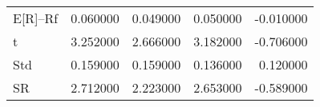 \begin{tabular}{lrrrr}
\toprule
\midrule
E[R]--Rf & 0.060000 & 0.049000 & 0.050000 & -0.010000 \\
t & 3.252000 & 2.666000 & 3.182000 & -0.706000 \\
Std & 0.159000 & 0.159000 & 0.136000 & 0.120000 \\
SR & 2.712000 & 2.223000 & 2.653000 & -0.589000 \\
\bottomrule
\end{tabular}
